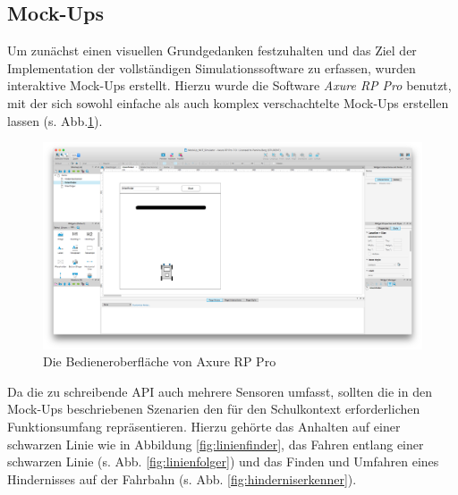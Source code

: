 \documentclass[paper=a4, pagesize, DIV=calc, BCOR=12.5mm, twoside=on, onecolumn=on, open = any, titlepage =on, parskip =half-, headsepline = on, footsepline = on, chapterprefix = on, appendixprefix = off, fontsize = 12pt, numbers = noenddot, abstract = on]{scrbook}
\numberwithin{equation}{chapter}
\theoremstyle{definition}
\theoremstyle{plain}
\theoremstyle{plain}
\theoremstyle{remark}
\theoremstyle{plain}
\theoremstyle{plain}
\begin{document}
\subsection{Mock-Ups} 
\onehalfspacing
Um zunächst einen visuellen Grundgedanken festzuhalten und das Ziel der Implementation der vollständigen Simulationssoftware zu erfassen, wurden interaktive Mock-Ups erstellt. Hierzu wurde die Software \emph{Axure RP Pro} benutzt, mit der sich sowohl einfache als auch komplex verschachtelte Mock-Ups erstellen lassen (s. Abb.\ref{fig:axure}).

\begin{figure}[htbp]
\centering
\includegraphics[scale=0.2]{images/axure_mockup.png} 
\caption{Die Bedieneroberfläche von Axure RP Pro}
\label{fig:axure}
\end{figure}

Da die zu schreibende API auch mehrere Sensoren umfasst, sollten die in den Mock-Ups beschriebenen Szenarien den für den Schulkontext erforderlichen Funktionsumfang repräsentieren. Hierzu gehörte das Anhalten auf einer schwarzen Linie wie in Abbildung \ref{fig:linienfinder}, das Fahren entlang einer schwarzen Linie (s. Abb. \ref{fig:linienfolger}) und das Finden und Umfahren eines Hindernisses auf der Fahrbahn (s. Abb. \ref{fig:hinderniserkenner}).
\end{document}
